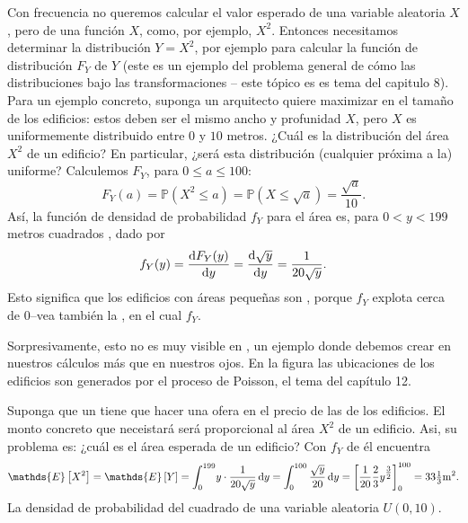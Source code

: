 \documentclass[10pt,twoside=false,twocolumn=false,BCOR=12mm,DIV=calc]{scrartcl} %
\theoremstyle{definition}
\begin{document}
Con frecuencia no queremos calcular el valor esperado de una variable aleatoria $X$, pero %
de una función $X$, como, por ejemplo, $X^2$. Entonces necesitamos determinar la distribución $Y=X^2$, por ejemplo para calcular la función de distribución $F_Y$ de $Y$ (este es un ejemplo del problema general de cómo las distribuciones bajo las transformaciones -- este tópico es es tema del capitulo 8). Para un ejemplo concreto, suponga un arquitecto quiere maximizar %
en el tamaño de los edificios: estos deben ser el mismo ancho y profunidad $X$, pero $X$ es uniformemente distribuido entre $0$ y $10$ metros. ¿Cuál es la distribución del área $X^2$ de un edificio? En particular, ¿será esta distribución (cualquier próxima a la) uniforme? Calculemos $F_Y$, para $0\le a\le 100$:
\begin{equation*}
  F_Y(a)=\mathds{P}\left(X^2\le a\right)=\mathds{P}\left(X\le\sqrt{a}\right)=\frac{\sqrt{a}}{10}.
\end{equation*}
Así, la función de densidad de probabilidad $f_Y$ para el área es, para $0<y<199$ metros cuadrados %
, dado por
\begin{equation*}
  f_Y(y)=\diff{F_Y(y)}{y}=\diff{\sqrt{y}}{y}=\frac{1}{20\sqrt{y}}.
\end{equation*}
Esto significa que los edificios con áreas pequeñas son %
, porque $f_Y$ explota cerca de 0--vea también la %
, en el cual %
$f_Y$.

Sorpresivamente, esto no es muy visible en %
, un ejemplo donde debemos crear en nuestros cálculos más que en nuestros ojos. En la figura las ubicaciones de los edificios son generados por el proceso de Poisson, el tema del capítulo 12.

Suponga que un %
tiene que hacer una ofera en el precio de las %
de los edificios. El monto concreto que neceistará será proporcional al área $X^2$ de un edificio. Asi, su problema es: ¿cuál es el área esperada de un edificio? Con $f_Y$ de %
él encuentra
\begin{equation*}
  \mathds{E}\left[X^2\right]=\mathds{E}\left[Y\right]=\int_{0}^{199}\! y\cdot\frac{1}{20\sqrt{y}}\dl y=\int_{0}^{100}\frac{\sqrt{y}}{20}\dl y={\left[\frac{1}{20}\frac{2}{3}y^{\tfrac{3}{2}}\right]}_{0}^{100}=33\tfrac{1}{3}\mathrm{m}^2.
\end{equation*}
La densidad de probabilidad del cuadrado de una variable aleatoria $U\left(0,10\right)$.
\end{document}
